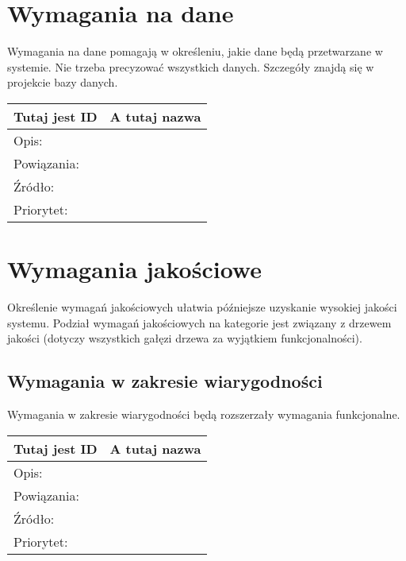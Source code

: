 \documentclass[a4paper,10pt]{article}
\begin{document}
\section{Wymagania na dane}

Wymagania na dane pomagają w określeniu, jakie dane będą przetwarzane w systemie. Nie trzeba precyzować wszystkich danych. Szczegóły znajdą się w projekcie bazy danych.

\begin{center}
\begin{tabular}{|l|l|} \hline

Tutaj jest ID & A tutaj nazwa \\ \hline
Opis: &  \\ \hline
Powiązania: &  \\ \hline
Źródło: &  \\ \hline
Priorytet: &  \\ \hline

\end{tabular}
\end{center}

\section{Wymagania jakościowe}

Określenie wymagań jakościowych ułatwia późniejsze uzyskanie wysokiej jakości systemu. Podział wymagań jakościowych na kategorie jest związany z drzewem jakości (dotyczy wszystkich gałęzi drzewa za wyjątkiem funkcjonalności).

\subsection{Wymagania w zakresie wiarygodności}

Wymagania w zakresie wiarygodności będą rozszerzały wymagania funkcjonalne. 

\begin{center}
\begin{tabular}{|l|l|} \hline

Tutaj jest ID & A tutaj nazwa \\ \hline
Opis: &  \\ \hline
Powiązania: &  \\ \hline
Źródło: &  \\ \hline
Priorytet: &  \\ \hline

\end{tabular}
\end{center}
\end{document}
